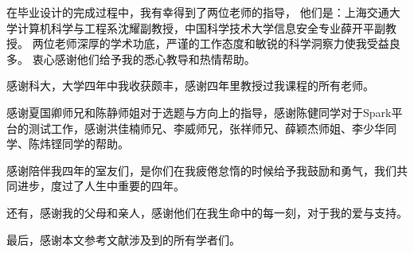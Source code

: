 \begin{acknowledgements}

在毕业设计的完成过程中，我有幸得到了两位老师的指导，
他们是：上海交通大学计算机科学与工程系沈耀副教授，中国科学技术大学信息安全专业薛开平副教授。
两位老师深厚的学术功底，严谨的工作态度和敏锐的科学洞察力使我受益良多。
衷心感谢他们给予我的悉心教导和热情帮助。

感谢科大，大学四年中我收获颇丰，感谢四年里教授过我课程的所有老师。

感谢夏国卿师兄和陈静师姐对于选题与方向上的指导，感谢陈健同学对于Spark平台的测试工作，感谢洪佳楠师兄、李威师兄，张祥师兄、薛颖杰师姐、李少华同学、陈炜铿同学的帮助。

感谢陪伴我四年的室友们，是你们在我疲倦怠惰的时候给予我鼓励和勇气，我们共同进步，度过了人生中重要的四年。

还有，感谢我的父母和亲人，感谢他们在我生命中的每一刻，对于我的爱与支持。

最后，感谢本文参考文献涉及到的所有学者们。

\end{acknowledgements}
